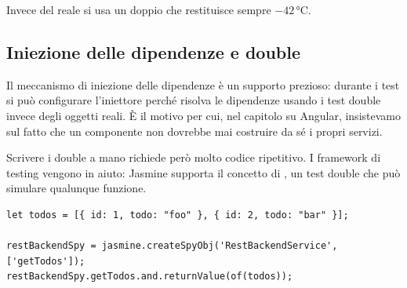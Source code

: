 Invece del  reale si usa un doppio che restituisce
sempre $-42$\,°C.

\subsection{Iniezione delle dipendenze e double}

Il meccanismo di iniezione delle dipendenze è un supporto prezioso: durante i
test si può configurare l'iniettore perché risolva le dipendenze usando i test
double invece degli oggetti reali. È il motivo per cui, nel capitolo su Angular,
insistevamo sul fatto che un componente non dovrebbe mai costruire da sé i
propri servizi.

Scrivere i double a mano richiede però molto codice ripetitivo. I framework di
testing vengono in aiuto: Jasmine supporta il concetto di , un test
double che può simulare qualunque funzione.

\begin{affianco}[0.58][c]
\codicepiccolo
\begin{lstlisting}[style=ts, name=spy.ts]
let todos = [{ id: 1, todo: "foo" }, { id: 2, todo: "bar" }];

restBackendSpy = jasmine.createSpyObj('RestBackendService', ['getTodos']);
restBackendSpy.getTodos.and.returnValue(of(todos));
\end{lstlisting}
\risultato
\begin{immagine}
\end{immagine}
\end{affianco}

